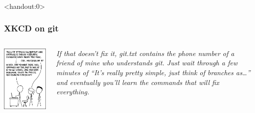 \documentclass[10pt,svgnames]{beamer}
\begin{document}
\begin{frame}<handout:0>
\label{xkcd_git}
\frametitle{XKCD on git \hfill\hyperlink{git_cons}{}}

\begin{columns}[T,onlytextwidth]
\includegraphics[width=\textwidth]{figures/xkcd-git.png}

\vfill
\emph{If that doesn't fix it, git.txt contains the phone number of a friend of mine who understands git.
Just wait through a few minutes of “It's really pretty simple, just think of branches as\ldots” and eventually you'll learn the commands that will fix everything.
}
\end{columns}
\end{frame}
\end{document}
